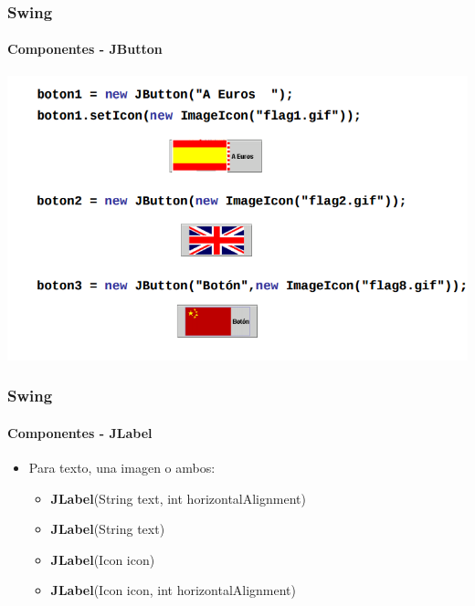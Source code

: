 \documentclass{beamer}
\begin{document}
	\begin{frame}
		\frametitle{Swing}
		\framesubtitle{Componentes - JButton}

        \begin{center}
	        	\includegraphics[scale=.45]{images/ejemplo-jbutton.png}
	    \end{center}
	\end{frame}		

    \begin{frame}
		\frametitle{Swing}
		\framesubtitle{Componentes - JLabel}

        \begin{itemize}
		    \item[\checkmark] Para texto, una imagen o ambos:
		    \begin{itemize}
        		    \item[] \textbf{JLabel}(String text, int horizontalAlignment)
        		    \item[] \textbf{JLabel}(String text)
        		    \item[] \textbf{JLabel}(Icon icon)
        		    \item[] \textbf{JLabel}(Icon icon, int horizontalAlignment)
	    	    \end{itemize}
		\end{itemize}
	\end{frame}	
\end{document}
